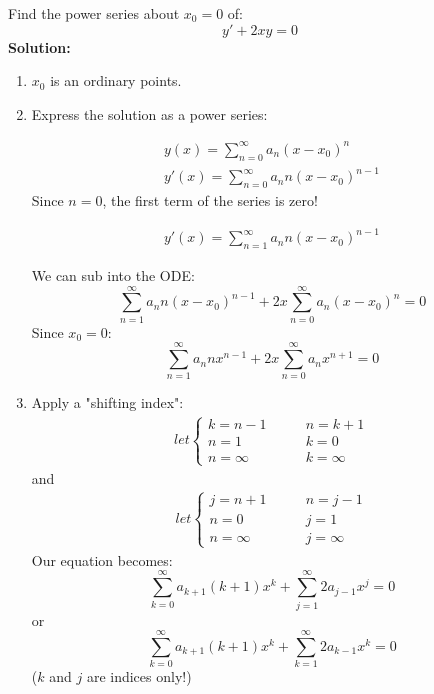 \begin{exmp}{}
Find the power series about $x_0=0$ of:
\begin{equation*}
y'+2xy=0
\end{equation*}
\textbf{Solution:}\\
\begin{enumerate}
\item $x_0$ is an ordinary points.
\item Express the solution as a power series:

\begin{align*}
y(x) = \sum^\infty_{n=0} a_n\left(x-x_0\right)^n\\
y'(x) = \sum^\infty_{n=0} a_n n\left(x-x_0\right)^{n-1}
\end{align*}
Since $n=0$, the first term of the series is zero!

\begin{align*}
y'(x) = \sum^\infty_{n=1} a_n n\left(x-x_0\right)^{n-1}
\end{align*}

We can sub into the ODE:
\begin{equation*}
\sum^\infty_{n=1} a_n n\left(x-x_0\right)^{n-1}+2x\sum^\infty_{n=0} a_n\left(x-x_0\right)^n=0
\end{equation*}
Since $x_0=0$:
\begin{equation*}
\sum^\infty_{n=1} a_n nx^{n-1}+2x\sum^\infty_{n=0} a_nx^{n+1}=0
\end{equation*}
\item Apply a "shifting index":
\begin{align*}
let \begin{cases}
k=n-1 \qquad &n=k+1\\
n=1 &k=0\\
n=\infty &k=\infty
\end{cases}
\end{align*}
 and 
 \begin{align*}
let \begin{cases}
j=n+1 \qquad &n=j-1\\
n=0 &j=1\\
n=\infty &j=\infty
\end{cases}
\end{align*}
Our equation becomes:
\begin{equation*}
\sum^\infty_{k=0} a_{k+1} (k+1) x^{k}+\sum^\infty_{j=1}2 a_{j-1}x^{j}=0
\end{equation*}
or
\begin{equation*}
\sum^\infty_{k=0} a_{k+1} (k+1) x^{k}+\sum^\infty_{k=1}2 a_{k-1}x^{k}=0
\end{equation*}
($k$ and $j$ are indices only!)


\end{enumerate}
\end{exmp}
